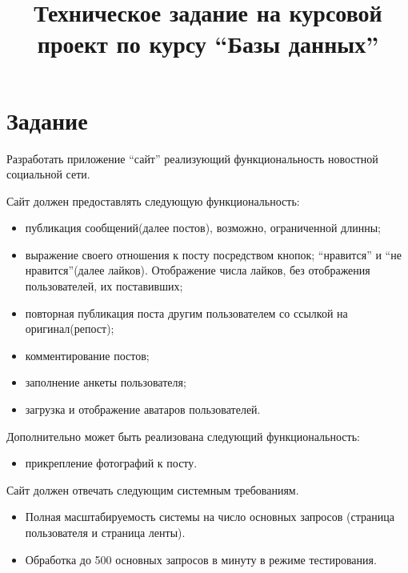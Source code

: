 \title{Техническое задание на курсовой проект по курсу ``Базы данных''}

\section{Задание}
Разработать приложение ``сайт'' реализующий функциональность новостной социальной сети.

Сайт должен предоставлять следующую функциональность:
\begin{itemize}
\item публикация сообщений(далее постов), возможно, ограниченной длинны;
\item выражение своего отношения к посту посредством кнопок;
``нравится'' и ``не нравится''(далее лайков). 
Отображение числа лайков, без отображения пользователей, их поставивших;
\item повторная публикация поста другим пользователем со ссылкой
на оригинал(репост);
\item комментирование постов;
\item заполнение анкеты пользователя;
\item загрузка и отображение аватаров пользователей.
\end{itemize}

Дополнительно может быть реализована следующий функциональность:
\begin{itemize}
\item прикрепление фотографий к посту.
\end{itemize}

Сайт должен отвечать следующим системным требованиям.
\begin{itemize}
\item Полная масштабируемость системы на число основных запросов
      (страница пользователя и страница ленты).
\item Обработка до 500 основных запросов в минуту в режиме тестирования.
\end{itemize}

